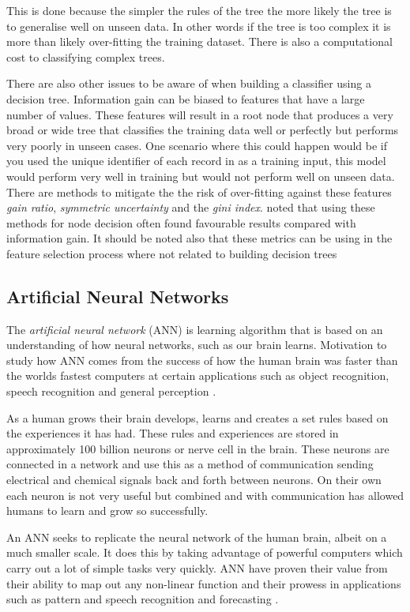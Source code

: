 This is done because the simpler the rules of the tree the more likely the tree is to generalise well on unseen data. In other words if the tree is too complex it is more than likely over-fitting the training dataset. There is also a computational cost to classifying complex trees. 

There are also other issues to be aware of when building a classifier using a decision tree. Information gain can be biased to features that have a large number of values. These features will result in a root node that produces a very broad or wide tree that classifies the training data well or perfectly but performs very poorly in unseen cases. One scenario where this could happen would be if you used the unique identifier of each record in as a training input, this model would perform very well in training but would not perform well on unseen data. There are methods to mitigate the the risk of over-fitting against these features \textit{gain ratio}, \textit{symmetric uncertainty} and the \textit{gini index}. \cite{quinlan_induction_1986} noted that using these methods for node decision often found favourable results compared with information gain. It should be noted also that these metrics can be using in the feature selection process where not related to building decision trees


\subsection{Artificial Neural Networks} \label{neuralNets}
The \textit{artificial neural network} (ANN) is learning algorithm that is based on an understanding of how neural networks, such as our brain learns. Motivation to study how ANN comes from the success of how the human brain was faster than the worlds fastest computers at certain applications such as object recognition, speech recognition and general perception \citep{haykin_neural_1998}.

As a human grows their brain develops, learns and creates a set rules based on the experiences it has had. These rules and experiences are stored in approximately 100 billion neurons or nerve cell in the brain. These neurons are connected in a network and use this as a method of communication sending electrical and chemical signals back and forth between neurons. On their own each neuron is not very useful but combined and with communication has allowed humans to learn and grow so successfully. 

An ANN seeks to replicate the neural network of the human brain, albeit on a much smaller scale. It does this by taking advantage of powerful computers which carry out a lot of simple tasks very quickly. ANN have proven their value from their ability to map out any non-linear function \citep{white_learning_1989} and their prowess in applications such as pattern and speech recognition and forecasting \citep{kaastra_forecasting_1995}.

